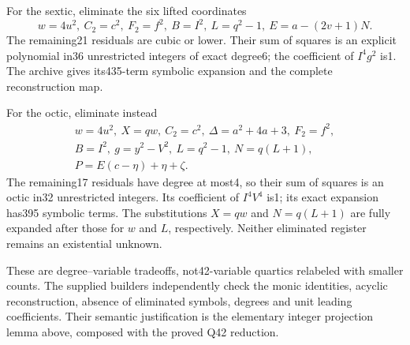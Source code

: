 For the sextic, eliminate the six lifted coordinates
\[
 w=4u^2,\ C_2=c^2,\ F_2=f^2,\ B=I^2,\ L=q^2-1,
 \ E=a-(2v+1)N.
\]
The remaining21 residuals are cubic or lower. Their sum of squares is an
explicit polynomial in36 unrestricted integers of exact degree6;
the coefficient of $I^4g^2$ is1. The archive gives its435-term symbolic
expansion and the complete reconstruction map.

For the octic, eliminate instead
\[
\begin{gathered}
 w=4u^2,\ X=qw,\ C_2=c^2,\ \Delta=a^2+4a+3,\ F_2=f^2,\\
 B=I^2,\ g=y^2-V^2,\ L=q^2-1,\ N=q(L+1),\\
 P=E(c-\eta)+\eta+\zeta.
\end{gathered}
\]
The remaining17 residuals have degree at most4, so their sum of squares is
an octic in32 unrestricted integers. Its coefficient of $I^4V^4$ is1;
its exact expansion has395 symbolic terms. The substitutions $X=qw$ and
$N=q(L+1)$ are fully expanded after those for $w$ and $L$, respectively.
Neither eliminated register remains an existential unknown.

These are degree--variable tradeoffs, not42-variable quartics relabeled
with smaller counts. The supplied builders independently check the monic
identities, acyclic reconstruction, absence of eliminated symbols, degrees
and unit leading coefficients. Their semantic justification is the elementary
integer projection lemma above, composed with the proved Q42 reduction.
